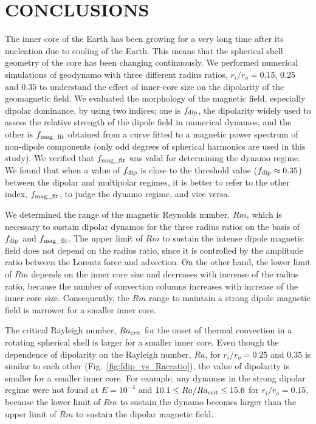 \section{CONCLUSIONS}

The inner core of the Earth has been growing for a very long time after its nucleation due to cooling of the Earth.
This means that the spherical shell geometry of the core has been changing continuously.
%
We performed numerical simulations of geodynamo with three different radius ratios, $r_i / r_o = 0.15$, $0.25$ and $0.35$ to understand the effect of inner-core size on the dipolarity of the geomagnetic field.
We evaluated the morphology of the magnetic field, especially dipolar dominance, by using two indices; one is $f_{\rm dip}$, the dipolarity widely used to assess the relative strength of the dipole field in numerical dynamos, and the other is $f_{\rm mag\_fit}$ obtained from a curve fitted to a magnetic power spectrum of non-dipole components (only odd degrees of spherical harmonics are used in this study).
We verified that $f_{\rm mag\_fit}$ was valid for determining the dynamo regime.
We found that when a value of $f_{\rm dip}$ is close to the threshold value ($f_{\rm dip} \approx 0.35$) between the dipolar and multipolar regimes, it is better to refer to the other index, $f_{\rm mag\_fit}$, to judge the dynamo regime, and vice versa.

We determined the range of the magnetic Reynolds number, $Rm$, which is necessary to sustain dipolar dynamos for the three radius ratios on the basis of $f_{\rm dip}$ and $f_{\rm mag\_fit}$.
%
The upper limit of $Rm$ to sustain the intense dipole magnetic field does not depend on the radius ratio, since it is controlled by the amplitude ratio between the Lorentz force and advection. 
On the other hand, the lower limit of $Rm$ depends on the inner core size and decreases with increase of the radius ratio, because the number of convection columns increases with increase of the inner core size. 
%
Consequently, the $Rm$ range to maintain a strong dipole magnetic field is narrower for a smaller inner core.

The critical Rayleigh number, $Ra_{\rm crit}$ for the onset of thermal convection in a rotating spherical shell is larger for a smaller inner core.
Even though the dependence of dipolarity on the Rayleigh number, $Ra$, for $r_i / r_o = 0.25$ and $0.35$ is similar to each other (Fig.~\ref{fig:fdip_vs_Racratio}), the value of dipolarity is smaller for a smaller inner core.
For example, any dynamos in the strong dipolar regime were not found at $E = 10^{-3}$ and $10.1 \le Ra / Ra_{\rm crit} \le 15.6$ for $r_i / r_o = 0.15$, 
because the lower limit of $Rm$ to sustain the dynamo becomes larger than the upper limit of $Rm$ to sustain the dipolar magnetic field. 

